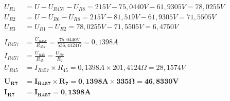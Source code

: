 \begin{align*}
U_{R1} &= U - U_{R457} - U_{R8} = 215 V - 75,0440 V - 61,9305 V = 78,0255 V\\
U_{R2} &= U - U_{R6} - U_{R8} = 215 V - 81,519 V - 61,9305 V = 71,5505 V\\
U_{R3} &= U_{R1} - U_{R2} = 78,0255 V - 71,5505 V = 6,4750 V\\ \\
I_{R457} &= \frac {U_{R457}} {R_{457}} = \frac {75,0440 V} {536,4124\Omega} = 0,1398 A\\
I_{R457} &= \frac {U_{R45}} {R_{45}} = \frac {U_{R7}} {R_7}\\
U_{R45} &= I_{R457} \times R_{45} = 0,1398 A \times 201,4124\Omega = 28,1574 V\\ \\
\boldsymbol{U_{R7} }&=\boldsymbol{ I_{R457} \times R_7 = 0,1398 A \times 335\Omega = 46,8330 V}\\
\boldsymbol{I_{R7} }&=\boldsymbol{ I_{R457} = 0,1398 A}
\end{align*}